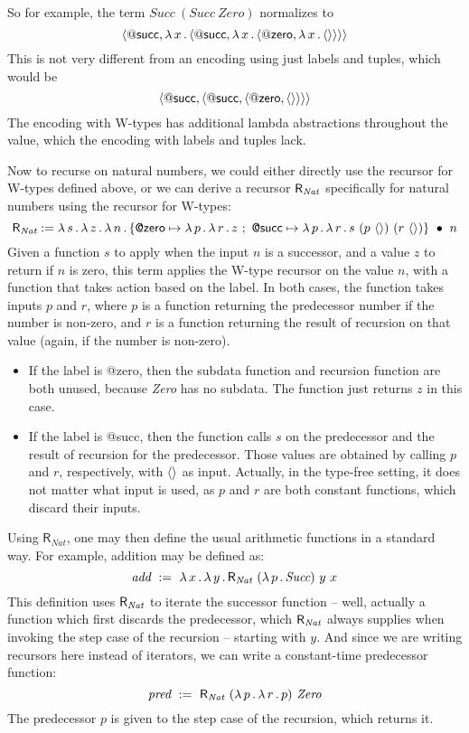 \documentclass{article}
\begin{document}
\noindent So for example, the term $\textit{Succ}\ (\textit{Succ}\ \textit{Zero})$
normalizes to
\[
\langle \mathsf{@succ} , \lambda\, x\, .\, \langle \mathsf{@succ} , \lambda\, x\, .\, \langle \mathsf{@zero} , \lambda\, x\, .\, \langle\rangle \rangle \rangle \rangle
\]
\noindent This is not very different from an encoding using just labels and tuples, which would
be
\[
\langle \mathsf{@succ} , \langle \mathsf{@succ} , \langle \mathsf{@zero} , \langle\rangle \rangle \rangle \rangle
\]
\noindent The encoding with W-types has additional lambda abstractions throughout the value, which
the encoding with labels and tuples lack.

Now to recurse on natural numbers, we could either directly use the recursor for W-types defined above,
or we can derive a recursor $\mathsf{R}_{\textit{Nat}}$ specifically for natural numbers using the recursor for W-types:
\[
\rrec := \lam{s}{\lam{z}{\lam{n}{\wrec{\{\textsf{@zero} \mapsto \lam{p}{\lam{r}{z}}\ ;\ \textsf{@succ} \mapsto \lam{p}{\lam{r}{s\ (p\ \wunit)\ (r\ \wunit)}}\}}{n}}}}
\]
\noindent Given a function $s$ to apply when the input $n$ is a successor, and a value $z$ to return if $n$ is zero, this
term applies the W-type recursor on the value $n$, with a function that takes action based on the label.  In both
cases, the function takes inputs $p$ and $r$, where $p$ is a function returning the predecessor number if the number is non-zero, and
$r$ is a function returning the result of recursion on that value (again, if the number is non-zero).
\begin{itemize}
\item If the label is \textsf{@zero}, then the subdata function and recursion function are both unused, because
  \textit{Zero} has no subdata.  The function just
    returns $z$ in this case.
  \item If the label is \textsf{@succ}, then the function calls $s$ on
    the predecessor and the result of recursion for the predecessor.
    Those values are obtained by calling $p$ and $r$, respectively,
    with $\langle\rangle$ as input.  Actually, in the type-free setting, it
    does not matter what input is used, as $p$ and $r$ are both
    constant functions, which discard their inputs.
\end{itemize}

Using $\mathsf{R}_{\textit{Nat}}$, one may then define the usual arithmetic functions in a standard way.  For example, addition may be defined as:
\[
\textit{add}\ :=\ \lam{x}{\lam{y}{\rrec\ (\lam{p}{\textit{Succ}})\ y\ x}}
\]
\noindent This definition uses $\mathsf{R}_{\textit{Nat}}$ to iterate the successor function -- well, actually a function which first discards the predecessor,
which $\mathsf{R}_{\textit{Nat}}$ always supplies when invoking the step case of the recursion -- starting with $y$.  And since we are writing recursors here
instead of iterators, we can write a constant-time predecessor function:
\[
\textit{pred}\ :=\ \rrec\ (\lam{p}{\lam{r}{p}})\ \textit{Zero}
\]
\noindent The predecessor $p$ is given to the step case of the recursion, which returns it.
\end{document}
